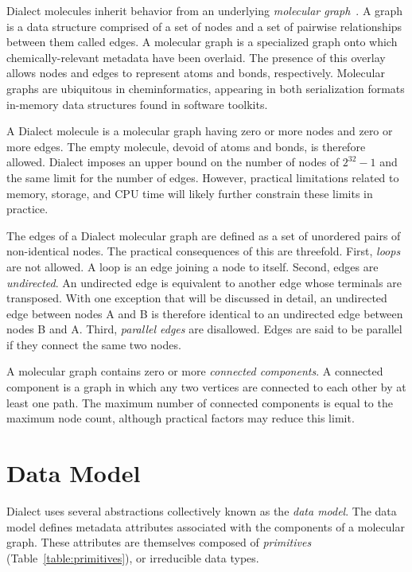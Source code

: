 \documentclass{article}
\begin{document}
Dialect molecules inherit behavior from an underlying \textit{molecular graph}~\cite{balaban:1985}. A graph is a data structure comprised of a set of nodes and a set of pairwise relationships between them called edges. A molecular graph is a specialized graph onto which chemically-relevant metadata have been overlaid. The presence of this overlay allows nodes and edges to represent atoms and bonds, respectively. Molecular graphs are ubiquitous in cheminformatics, appearing in both serialization formats in-memory data structures found in software toolkits.

A Dialect molecule is a molecular graph having zero or more nodes and zero or more edges. The empty molecule, devoid of atoms and bonds, is therefore allowed. Dialect imposes an upper bound on the number of nodes of $2^{32} - 1$ and the same limit for the number of edges. However, practical limitations related to memory, storage, and CPU time will likely further constrain these limits in practice.

The edges of a Dialect molecular graph are defined as a set of unordered pairs of non-identical nodes. The practical consequences of this are threefold. First, \textit{loops} are not allowed. A loop is an edge joining a node to itself. Second, edges are \textit{undirected}. An undirected edge is equivalent to another edge whose terminals are transposed. With one exception that will be discussed in detail, an undirected edge between nodes A and B is therefore identical to an undirected edge between nodes B and A. Third, \textit{parallel edges} are disallowed. Edges are said to be parallel if they connect the same two nodes.

A molecular graph contains zero or more \textit{connected components}. A connected component is a graph in which any two vertices are connected to each other by at least one path. The maximum number of connected components is equal to the maximum node count, although practical factors may reduce this limit.

\section*{Data Model}

Dialect uses several abstractions collectively known as the \textit{data model}. The data model defines metadata attributes associated with the components of a molecular graph. These attributes are themselves composed of \textit{primitives} (Table~\ref{table:primitives}), or irreducible data types.
\end{document}
